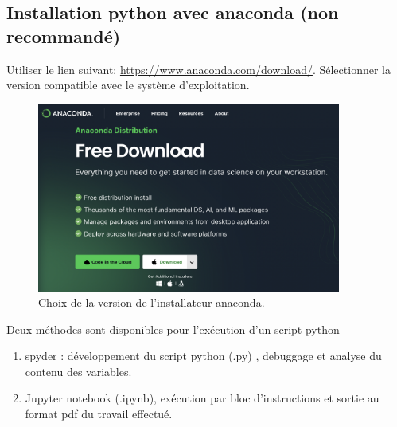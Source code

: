 \documentclass[a4paper,12pt]{article}
\begin{document}
\clearpage
\subsection{Installation python avec anaconda (non recommandé)}
Utiliser le lien suivant: \url{https://www.anaconda.com/download/}. S\'electionner la version compatible avec le syst\`eme d'exploitation.
\begin{figure}[h]
\begin{center}
\includegraphics[width=10cm]{./png/anaconda-install}
\end{center}
\caption{Choix de la version de l'installateur anaconda.}
\end{figure}
Deux m\'ethodes sont disponibles pour l'ex\'ecution d'un script python
\begin{enumerate}
\item spyder : d\'eveloppement du script python (.py) , debuggage et analyse du contenu des variables. 
\item Jupyter notebook (.ipynb), ex\'ecution par bloc d'instructions et sortie au format pdf du travail effectué.
\end{enumerate}



\clearpage
\end{document}
